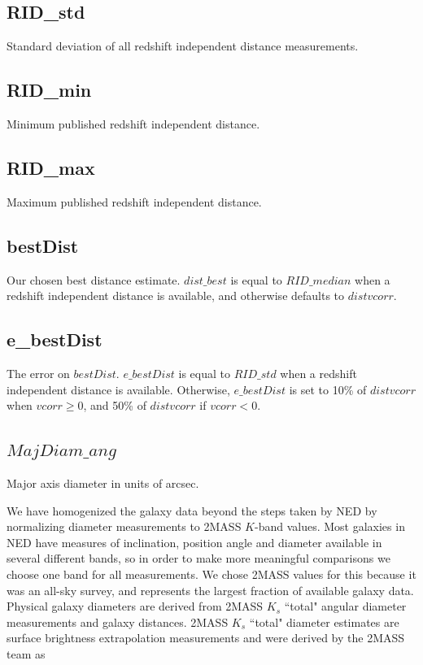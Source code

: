 \documentclass[iop]{emulateapj-rtx4}
\begin{document}
\subsection{RID\_std}
Standard deviation of all redshift independent distance measurements.

\subsection{RID\_min}
Minimum published redshift independent distance.

\subsection{RID\_max}
Maximum published redshift independent distance.

\subsection{bestDist}
Our chosen best distance estimate. $dist\_best$ is equal to $RID\_median$ when a redshift independent distance is available, and otherwise defaults to $distvcorr$.

\subsection{e\_bestDist}
The error on $bestDist$. $e\_bestDist$ is equal to $RID\_std$ when a redshift independent distance is available. Otherwise, $e\_bestDist$ is set to 10\% of $distvcorr$ when $vcorr \geq 0$, and 50\% of $distvcorr$ if $vcorr < 0$.

\subsection{$MajDiam\_ang$} \label{diameters}
Major axis diameter in units of arcsec.

We have homogenized the galaxy data beyond the steps taken by NED by normalizing diameter measurements to 2MASS $K$-band values. Most galaxies in NED have measures of inclination, position angle and diameter available in several different bands, so in order to make more meaningful comparisons we choose one band for all measurements. We chose 2MASS values for this because it was an all-sky survey, and represents the largest fraction of available galaxy data. Physical galaxy diameters are derived from 2MASS $K_s$ ``total" angular diameter measurements and galaxy distances. 2MASS $K_s$ ``total" diameter estimates are surface brightness extrapolation measurements and were derived by the 2MASS team as 
\end{document}
